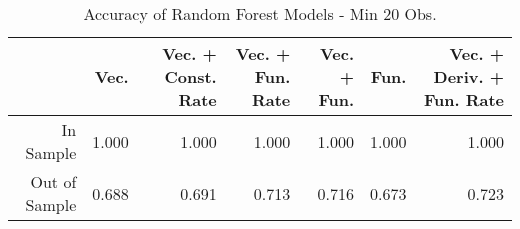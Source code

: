 \begin{table}[ht]
\centering
\begin{tabular}{rrrrrrr}
  \hline
 & Vec. & Vec. + Const. Rate & Vec. + Fun. Rate & Vec. + Fun. & Fun. & Vec. + Deriv. + Fun. Rate \\ 
  \hline
In Sample & 1.000 & 1.000 & 1.000 & 1.000 & 1.000 & 1.000 \\ 
  Out of Sample & 0.688 & 0.691 & 0.713 & 0.716 & 0.673 & 0.723 \\ 
   \hline
\end{tabular}
\caption{Accuracy of Random Forest Models - Min 20 Obs.} 
\label{rf_20obs_acc}
\end{table}
